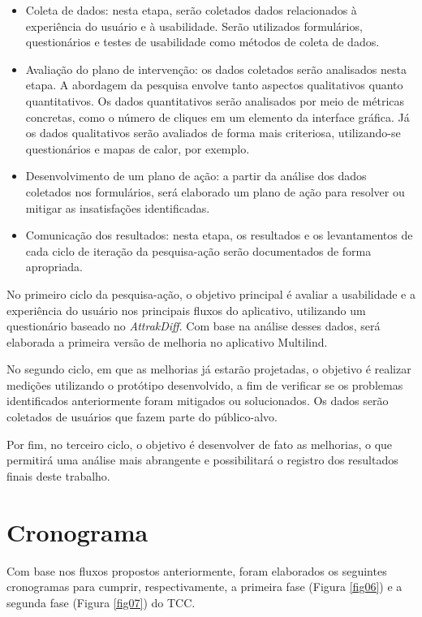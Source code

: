 \begin{itemize}
	\item Coleta de dados: nesta etapa, serão coletados dados relacionados à experiência do usuário e à usabilidade. Serão utilizados formulários, questionários e testes de usabilidade como métodos de coleta de dados.
	\item Avaliação do plano de intervenção: os dados coletados serão analisados nesta etapa. A abordagem da pesquisa envolve tanto aspectos qualitativos quanto quantitativos. Os dados quantitativos serão analisados por meio de métricas concretas, como o número de cliques em um elemento 
	da interface gráfica. Já os dados qualitativos serão avaliados de forma mais criteriosa, utilizando-se questionários e mapas de calor, por exemplo.
	\item Desenvolvimento de um plano de ação: a partir da análise dos dados coletados nos formulários, será elaborado um plano de ação para resolver ou mitigar as insatisfações identificadas.
	\item Comunicação dos resultados: nesta etapa, os resultados e os levantamentos de cada ciclo de iteração da pesquisa-ação serão documentados de forma apropriada.
\end{itemize}

No primeiro ciclo da pesquisa-ação, o objetivo principal é avaliar a usabilidade e a experiência do usuário nos principais fluxos do aplicativo, utilizando um questionário baseado no \textit{AttrakDiff}. Com base na análise desses dados, será elaborada a primeira versão de melhoria no aplicativo Multilind.

No segundo ciclo, em que as melhorias já estarão projetadas, o objetivo é realizar medições utilizando o protótipo desenvolvido, a fim de verificar se os problemas identificados anteriormente foram mitigados ou solucionados. Os dados serão 
coletados de usuários que fazem parte do público-alvo.

Por fim, no terceiro ciclo, o objetivo é desenvolver de fato as melhorias, o que permitirá uma análise mais abrangente e possibilitará o registro dos resultados finais deste trabalho.

\section{Cronograma}
\label{sec:Cronograma}
Com base nos fluxos propostos anteriormente, foram elaborados os seguintes cronogramas para cumprir, respectivamente, a primeira fase (Figura \ref{fig06}) e a segunda fase (Figura \ref{fig07}) do TCC.


